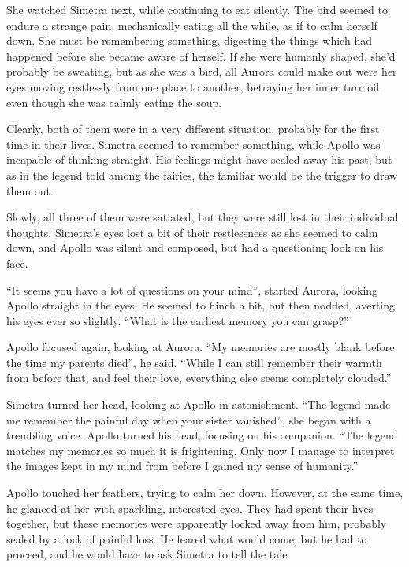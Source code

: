 She watched Simetra next, while continuing to eat silently. The bird seemed to endure a strange pain, mechanically eating all the while, as if to calm herself down. She must be remembering something, digesting the things which had happened before she became aware of herself. If she were humanly shaped, she'd probably be sweating, but as she was a bird, all Aurora could make out were her eyes moving restlessly from one place to another, betraying her inner turmoil even though she was calmly eating the soup.

Clearly, both of them were in a very different situation, probably for the first time in their lives. Simetra seemed to remember something, while Apollo was incapable of thinking straight. His feelings might have sealed away his past, but as in the legend told among the fairies, the familiar would be the trigger to draw them out. 

\froufrou{}

Slowly, all three of them were satiated, but they were still lost in their individual thoughts. Simetra's eyes lost a bit of their restlessness as she seemed to calm down, and Apollo was silent and composed, but had a questioning look on his face.

\enquote{It seems you have a lot of questions on your mind}, started Aurora, looking Apollo straight in the eyes. He seemed to flinch a bit, but then nodded, averting his eyes ever so slightly. \enquote{What is the earliest memory you can grasp?}

Apollo focused again, looking at Aurora. \enquote{My memories are mostly blank before the time my parents died}, he said. \enquote{While I can still remember their warmth from before that, and feel their love, everything else seems completely clouded.}

Simetra turned her head, looking at Apollo in astonishment. \enquote{The legend made me remember the painful day when your sister vanished}, she began with a trembling voice. Apollo turned his head, focusing on his companion. \enquote{The legend matches my memories so much it is frightening. Only now I manage to interpret the images kept in my mind from before I gained my sense of humanity.}

Apollo touched her feathers, trying to calm her down. However, at the same time, he glanced at her with sparkling, interested eyes. They had spent their lives together, but these memories were apparently locked away from him, probably sealed by a lock of painful loss. He feared what would come, but he had to proceed, and he would have to ask Simetra to tell the tale.

